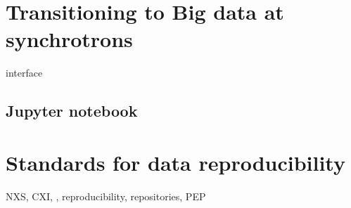 \section{Transitioning to Big data at synchrotrons}
interface

\subsection{Jupyter notebook}

\section{Standards for data reproducibility}

NXS, CXI, , reproducibility, repositories, PEP

